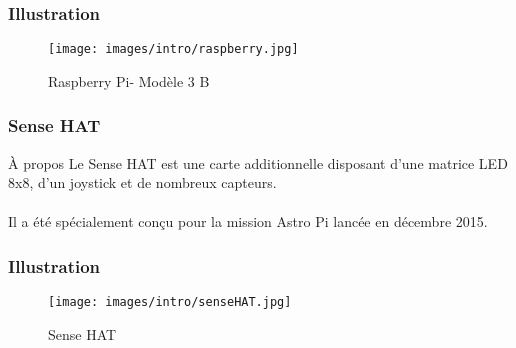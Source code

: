     \begin{frame}
        \frametitle{Illustration}
        \begin{figure}[h]
            \centering
            \texttt{[image: images/intro/raspberry.jpg]}
            \caption{Raspberry Pi- Modèle 3 B}
        \end{figure}
    \end{frame}
    
    \begin{frame}
        \frametitle{Sense HAT}
        \begin{block}{À propos}
            Le Sense HAT est une carte additionnelle disposant d’une matrice LED 8x8, d’un joystick et de nombreux capteurs. \\
            ~\\
            Il a été spécialement conçu pour la mission Astro Pi lancée en décembre 2015.
        \end{block}
        
    \end{frame}
    
    \begin{frame}
        \frametitle{Illustration}
        \begin{figure}[h]
            \centering
            \texttt{[image: images/intro/senseHAT.jpg]}
            \caption{Sense HAT}
        \end{figure}
    \end{frame}